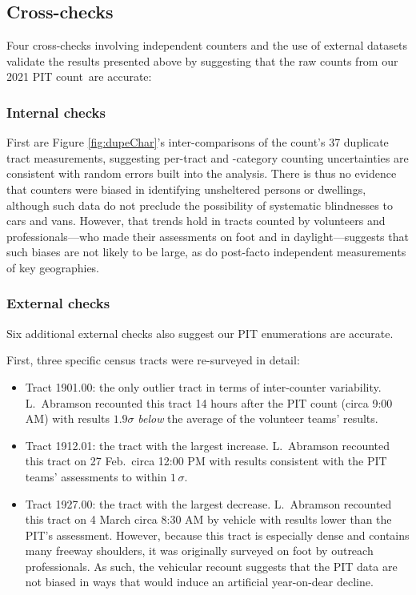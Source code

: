 \documentclass[11pt,twocolumn]{article}
\def\Count{count}
\begin{document}
\subsection{Cross-checks}
\label{sec:crossChecks}

Four cross-checks involving independent counters and the use of external datasets validate the
results presented above by suggesting that the raw counts from our 2021 PIT \Count\ are accurate:

\subsubsection{Internal checks}

First are Figure \ref{fig:dupeChar}'s inter-comparisons of the count's 37 duplicate tract 
measurements, suggesting per-tract and -category counting uncertainties are consistent with  
random errors built into the analysis. There is thus no evidence that counters were biased in
identifying unsheltered persons or dwellings, although such data do not preclude the
possibility of systematic blindnesses to cars and vans. However, that trends hold in tracts counted 
by volunteers and professionals---who made their assessments on foot and in daylight---suggests 
that such biases are not likely to be large, as do post-facto independent measurements of 
key geographies.

\subsubsection{External checks}

Six additional external checks also suggest our PIT enumerations are accurate.

First, three specific census tracts were re-surveyed in detail:
\begin{itemize}
	\item Tract 1901.00: the only outlier tract in terms of inter-counter variability. L.~Abramson
		  recounted this tract 14 hours after the PIT count (circa 9:00 AM) with results 
		  $1.9\sigma$ {\it below} the average of the volunteer teams' results.
	\item Tract 1912.01: the tract with the largest increase. L.~Abramson recounted this tract on 
		27 Feb.\ circa 12:00 PM with results consistent with the PIT teams' assessments
		to within $1\,\sigma$.
	\item Tract 1927.00: the tract with the largest decrease. L.~Abramson recounted this tract
		on 4 March circa 8:30 AM by vehicle with results lower than the PIT's assessment. 
		However, because this tract is especially dense and contains many freeway shoulders,
		it was originally surveyed on foot by outreach professionals. As such, the vehicular recount
		suggests that the PIT data are not biased in ways that would induce an artificial 
		year-on-dear decline.				
\end{itemize}
\end{document}
